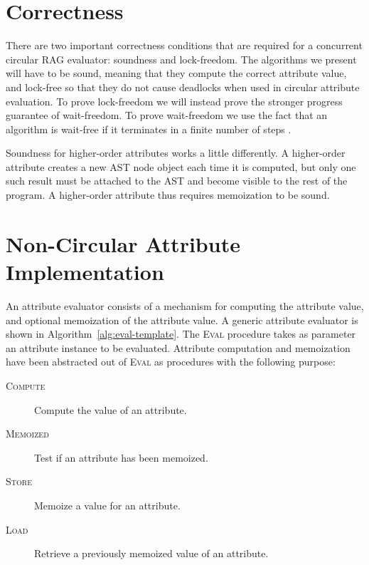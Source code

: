 {\begin{description}
\end{description}


\section{Correctness}

There are two important correctness conditions that are required for a concurrent circular
RAG evaluator: soundness and lock-freedom.
The algorithms we present will have to be sound, meaning that they compute the correct attribute
value, and lock-free so that they do not cause deadlocks when used in circular attribute evaluation.
To prove lock-freedom we will instead prove the stronger progress guarantee of wait-freedom.
To prove wait-freedom we use the fact that an algorithm is wait-free if it terminates in a finite
number of steps \cite{DBLP:conf/podc/Herlihy88}.

Soundness for higher-order attributes works a little differently. A higher-order attribute
creates a new AST node object each time it is computed, but only one such result must be
attached to the AST and become visible to the rest of the program. A higher-order attribute
thus requires memoization to be sound.
  
\section{Non-Circular Attribute Implementation}
\label{implementation}

An attribute evaluator consists of
a mechanism for computing the attribute value, and
optional memoization of the attribute value.  A generic attribute evaluator is
shown in Algorithm~\ref{alg:eval-template}. The \textsc{Eval} procedure takes as parameter
an attribute instance to be evaluated.
Attribute computation and memoization
have been abstracted out of \textsc{Eval} as procedures with the following purpose:

\begin{description}
  \item[\textsc{Compute}] Compute the value of an attribute.
  \item[\textsc{Memoized}] Test if an attribute has been memoized.
  \item[\textsc{Store}] Memoize a value for an attribute.
  \item[\textsc{Load}] Retrieve a previously memoized value of an attribute.
\end{description}

}
